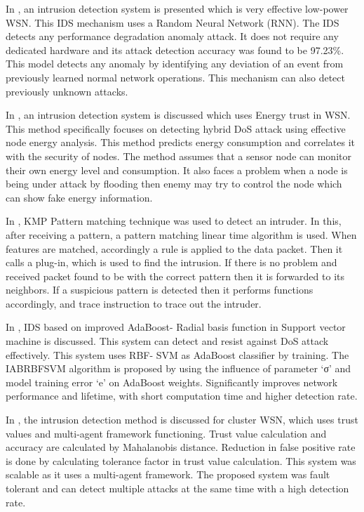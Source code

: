 \documentclass{svproc}
\begin{document}
In \cite{saeed2016random}, an intrusion detection system is presented which is very effective low-power WSN. This IDS mechanism uses a Random Neural Network (RNN). The IDS detects any performance degradation anomaly attack. It does not require any dedicated hardware and its attack detection accuracy was found to be 97.23\%. This model detects any anomaly by identifying any deviation of an event from previously learned normal network operations. This mechanism can also detect previously unknown attacks.\par
In \cite{jinhui2018intrusion}, an intrusion detection system is discussed which uses Energy trust in WSN. This method specifically focuses on detecting hybrid DoS attack using effective node energy analysis. This method predicts energy consumption and correlates it with the security of nodes. The method assumes that a sensor node can monitor their own energy level and consumption. It also faces a problem when a node is being under attack by flooding then enemy may try to control the node which can show fake energy information.\par
In \cite{kalnoor2018detection}, KMP Pattern matching technique was used to detect an intruder. In this, after receiving a pattern, a pattern matching linear time algorithm is used. When features are matched, accordingly a rule is applied to the data packet. Then it calls a plug-in, which is used to find the intrusion. If there is no problem and received packet found to be with the correct pattern then it is forwarded to its neighbors. If a suspicious pattern is detected then it performs functions accordingly, and trace instruction to trace out the intruder.\par
In \cite{jianjian2018novel}, IDS based on improved AdaBoost- Radial basis function in Support vector machine is discussed. This system can detect and resist against DoS attack effectively. This system uses RBF- SVM as AdaBoost classifier by training. The IABRBFSVM algorithm is proposed by using the influence of parameter ‘σ’ and model training error ‘e’ on AdaBoost weights. Significantly improves network performance and lifetime, with short computation time and higher detection rate.\par
In \cite{jin2017multi}, the intrusion detection method is discussed for cluster WSN, which uses trust values and multi-agent framework functioning. Trust value calculation and accuracy are calculated by Mahalanobis distance. Reduction in false positive rate is done by calculating tolerance factor in trust value calculation. This system was scalable as it uses a multi-agent framework. The proposed system was fault tolerant and can detect multiple attacks at the same time with a high detection rate.\par
\end{document}
